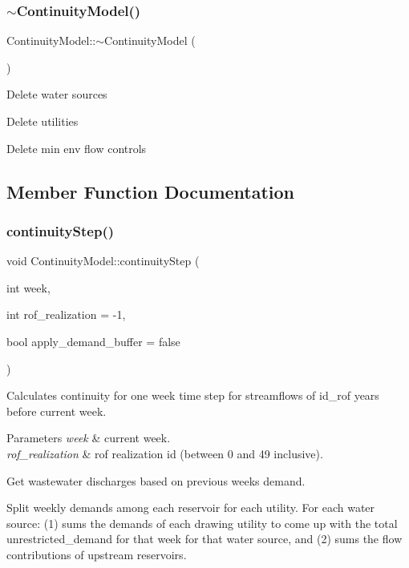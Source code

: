 \subsubsection{\texorpdfstring{$\sim$\+Continuity\+Model()}{~ContinuityModel()}}
{\footnotesize\ttfamily Continuity\+Model\+::$\sim$\+Continuity\+Model (\begin{DoxyParamCaption}{ }\end{DoxyParamCaption})\hspace{0.3cm}{\ttfamily [virtual]}}

Delete water sources

Delete utilities

Delete min env flow controls 

\subsection{Member Function Documentation}
\mbox{\label{classContinuityModel_ad880b6cb48eb24e8b78cc5425d85313b}} 
\subsubsection{\texorpdfstring{continuity\+Step()}{continuityStep()}}
{\footnotesize\ttfamily void Continuity\+Model\+::continuity\+Step (\begin{DoxyParamCaption}\item[{int}]{week,  }\item[{int}]{rof\+\_\+realization = {\ttfamily -\/1},  }\item[{bool}]{apply\+\_\+demand\+\_\+buffer = {\ttfamily false} }\end{DoxyParamCaption})}

Calculates continuity for one week time step for streamflows of id\+\_\+rof years before current week. 
\begin{DoxyParams}{Parameters}
{\em week} & current week. \\
\hline
{\em rof\+\_\+realization} & rof realization id (between 0 and 49 inclusive). \\
\hline
\end{DoxyParams}
Get wastewater discharges based on previous week\textquotesingle{}s demand.

Split weekly demands among each reservoir for each utility. For each water source\+: (1) sums the demands of each drawing utility to come up with the total unrestricted\+\_\+demand for that week for that water source, and (2) sums the flow contributions of upstream reservoirs.

